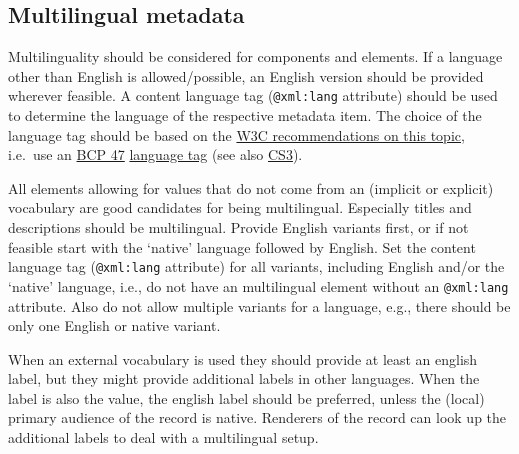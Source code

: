 \documentclass[]{article}
\date{}
\begin{document}
\subsection{Multilingual metadata}\label{multilingual-metadata}

Multilinguality should be considered for components and elements. If a
language other than English is allowed/possible, an English version
should be provided wherever feasible. A content language tag
(\texttt{@xml:lang} attribute) should be used to determine the language
of the respective metadata item. The choice of the language tag should
be based on the
\href{https://www.w3.org/International/questions/qa-choosing-language-tags}{W3C
recommendations on this topic}, i.e.~use an
\href{https://tools.ietf.org/rfc/bcp/bcp47.txt}{BCP 47}
\href{https://www.iana.org/assignments/language-subtag-registry/language-subtag-registry}{language
tag} (see also
\href{/authoring_component_metadata_records/the_component_section.md\#cs3}{CS3}).

All elements allowing for values that do not come from an (implicit or
explicit) vocabulary are good candidates for being multilingual.
Especially titles and descriptions should be multilingual. Provide
English variants first, or if not feasible start with the `native'
language followed by English. Set the content language tag
(\texttt{@xml:lang} attribute) for all variants, including English
and/or the `native' language, i.e., do not have an multilingual element
without an \texttt{@xml:lang} attribute. Also do not allow multiple
variants for a language, e.g., there should be only one English or
native variant.

When an external vocabulary is used they should provide at least an
english label, but they might provide additional labels in other
languages. When the label is also the value, the english label should be
preferred, unless the (local) primary audience of the record is native.
Renderers of the record can look up the additional labels to deal with a
multilingual setup.
\end{document}
